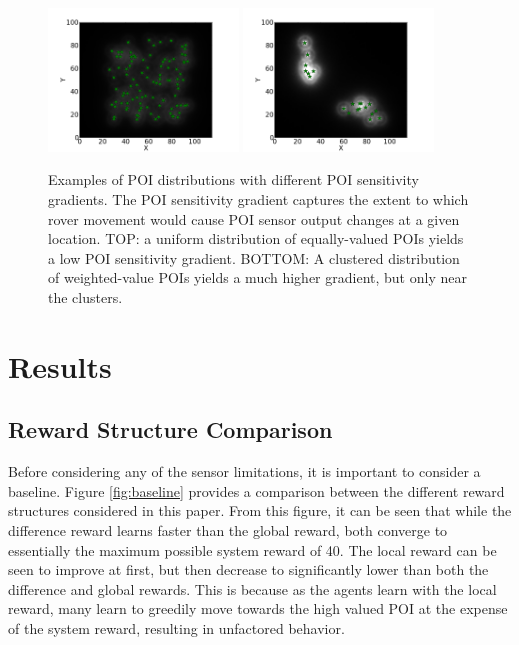 \documentclass[letterpaper, 10 pt, conference]{ieeeconf}  %
\begin{document}
\begin{figure}[h!]
    \centering
    \includegraphics[width=0.45\textwidth]{sensitivity-spread-0.png}
    \includegraphics[width=0.45\textwidth]{sensitivity-clustered-1.png}
    \caption{Examples of POI distributions with different POI sensitivity gradients. The POI sensitivity gradient captures the extent to which rover movement would cause POI sensor output changes at a given location. TOP: a uniform distribution of equally-valued POIs yields a low POI sensitivity gradient. BOTTOM: A clustered distribution of weighted-value POIs yields a much higher gradient, but only near the clusters. }
    \label{fig:signal-contrast}
\end{figure}

\section{Results}
\subsection{Reward Structure Comparison}
Before considering any of the sensor limitations, it is important to consider a baseline. Figure \ref{fig:baseline} provides a comparison between the different reward structures considered in this paper. From this figure, it can be seen that while the difference reward learns faster than the global reward, both converge to essentially the maximum possible system reward of 40. The local reward can be seen to improve at first, but then decrease to significantly lower than both the difference and global rewards. This is because as the agents learn with the local reward, many learn to greedily move towards the high valued POI at the expense of the system reward, resulting in unfactored behavior.
\end{document}
